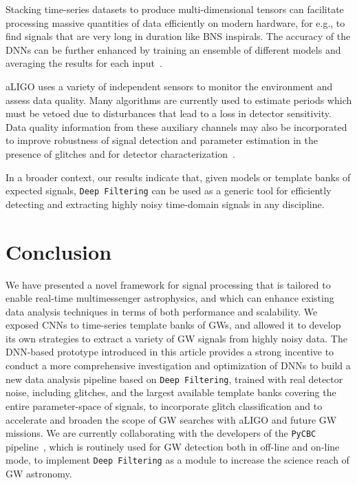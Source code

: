 \documentclass[aps,prd,%
amsmath,floats,floatfix, twocolumn, superscriptaddress,nofootinbib,showpacs]{revtex4-1}
\begin{document}
Stacking time-series datasets to produce multi-dimensional tensors can facilitate processing massive quantities of data efficiently on modern hardware, for e.g., to find signals that are very long in duration like BNS inspirals. The accuracy of the DNNs can be further enhanced by training an ensemble of different models and averaging the results for each input~\cite{DL-Book}. 

aLIGO uses a variety of independent sensors to monitor the environment and assess data quality. Many algorithms are currently used to estimate periods which must be vetoed due to disturbances that lead to a loss in detector sensitivity. Data quality information from these auxiliary channels may also be incorporated to improve robustness of signal detection and parameter estimation in the presence of glitches and for detector characterization~\cite{lauran:2015}. 

In a broader context, our results indicate that, given models or template banks of expected signals, \texttt{Deep Filtering} can be used as a generic tool for efficiently detecting and extracting highly noisy time-domain signals in any discipline.

\section{Conclusion}
\label{conc}


We have presented a novel framework for signal processing that is tailored to enable real-time multimessenger astrophysics, and which can enhance existing data analysis techniques in terms of both performance and scalability. We exposed CNNs to time-series template banks of GWs, and allowed it to develop its own strategies to extract a variety of GW signals from highly noisy data. The DNN-based prototype introduced in this article provides a strong incentive to conduct a more comprehensive investigation and optimization of DNNs to build a new data analysis pipeline based on \texttt{Deep Filtering}, trained with real detector noise, including glitches, and the largest available template banks covering the entire parameter-space of signals, to incorporate glitch classification and to accelerate and broaden the scope of GW searches with aLIGO and future GW missions. We are currently collaborating with the developers of the \texttt{PyCBC} pipeline~\cite{2016CQGra..33u5004U}, which is routinely used for GW detection both in off-line and on-line mode, to implement \texttt{Deep Filtering} as a module to increase the science reach of GW astronomy.
\end{document}
